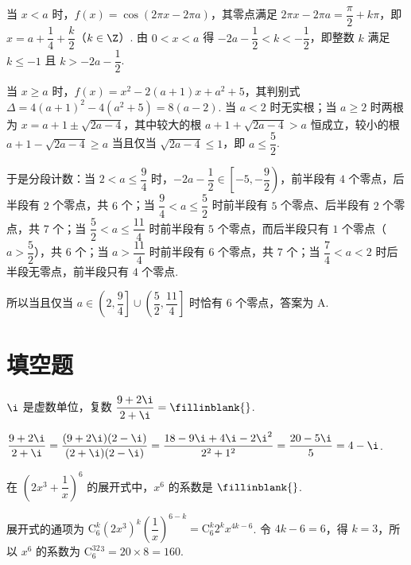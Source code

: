 
\begin{solution}
当 \(x<a\) 时，\(f(x)=\cos(2\pi x-2\pi a)\)，其零点满足 \(2\pi x-2\pi a=\dfrac{\pi}2+k\pi\)，即 \(x=a+\dfrac14+\dfrac k2\)（\(k\in\Z\)）. 由 \(0<x<a\) 得 \(-2a-\dfrac12<k<-\dfrac12\)，即整数 \(k\) 满足 \(k\le-1\) 且 \(k>-2a-\dfrac12\).

当 \(x\ge a\) 时，\(f(x)=x^2-2(a+1)x+a^2+5\)，其判别式 \(\Delta=4(a+1)^2-4(a^2+5)=8(a-2)\). 当 \(a<2\) 时无实根；当 \(a\ge2\) 时两根为 \(x=a+1\pm\sqrt{2a-4}\)，其中较大的根 \(a+1+\sqrt{2a-4}>a\) 恒成立，较小的根 \(a+1-\sqrt{2a-4}\ge a\) 当且仅当 \(\sqrt{2a-4}\le1\)，即 \(a\le\dfrac52\).

于是分段计数：当 \(2<a\le\dfrac94\) 时，\(-2a-\dfrac12\in\left[-5,-\dfrac92\right)\)，前半段有 \(4\) 个零点，后半段有 \(2\) 个零点，共 \(6\) 个；当 \(\dfrac94<a\le\dfrac52\) 时前半段有 \(5\) 个零点、后半段有 \(2\) 个零点，共 \(7\) 个；当 \(\dfrac52<a\le\dfrac{11}4\) 时前半段有 \(5\) 个零点，而后半段只有 \(1\) 个零点（\(a>\dfrac52\)），共 \(6\) 个；当 \(a>\dfrac{11}4\) 时前半段有 \(6\) 个零点，共 \(7\) 个；当 \(\dfrac74<a<2\) 时后半段无零点，前半段只有 \(4\) 个零点.

所以当且仅当 \(a\in\left(2,\dfrac94\right]\cup\left(\dfrac52,\dfrac{11}4\right]\) 时恰有 \(6\) 个零点，答案为 A.
\end{solution}

\section{填空题}

\begin{problem}
\( \i \) 是虚数单位，复数 \( \dfrac{9+2\i}{2+\i}=\fillinblank{} \).
\end{problem}


\begin{solution}
\(\dfrac{9+2\i}{2+\i}=\dfrac{(9+2\i)(2-\i)}{(2+\i)(2-\i)}=\dfrac{18-9\i+4\i-2\i^2}{2^2+1^2}=\dfrac{20-5\i}5=4-\i\).
\end{solution}

\begin{problem}
在 \( \left( 2x^3+\dfrac{1}{x} \right)^6 \) 的展开式中，\( x^6 \) 的系数是 \(\fillinblank{}\).
\end{problem}


\begin{solution}
展开式的通项为 \(\mathrm C_6^k(2x^3)^k\left(\dfrac1x\right)^{6-k}=\mathrm C_6^k2^kx^{4k-6}\). 令 \(4k-6=6\)，得 \(k=3\)，所以 \(x^6\) 的系数为 \(\mathrm C_6^32^3=20\times8=160\).
\end{solution}

